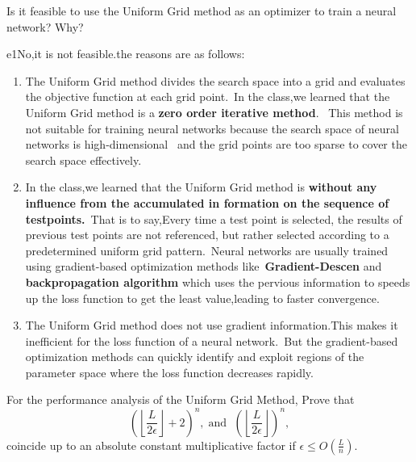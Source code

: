 \documentclass{article}
\begin{document}
\begin{excercise}\label{e1}
Is it feasible to use the Uniform Grid method as an optimizer to train a neural network?  Why?
\end{excercise}
\begin{SOLUTION}{e1}No,it is not feasible.the reasons are as follows:\\
\begin{enumerate}
	\item The Uniform Grid method divides the search space into a grid and evaluates the objective function at each grid point.\ 
	In the class,we learned that the Uniform Grid method is a \textbf{zero order iterative method}. \ 
	This method is not suitable for training neural networks because the search space of neural networks is high-dimensional \  
	and the grid points are too sparse to cover the search space effectively. 
	\item In the class,we learned that the Uniform Grid method is \textbf{without any influence from the accumulated in formation on the sequence of testpoints.}\
	That is to say,Every time a test point is selected, the results of previous test points are not referenced, but rather selected according to a predetermined uniform grid pattern.\
	Neural networks are usually trained using gradient-based optimization methods like\ 
	\textbf{Gradient-Descen} and \textbf{backpropagation algorithm} which uses the pervious information to speeds up the loss function to get the least value,leading to faster convergence.\ 
	\item The Uniform Grid method does not use gradient information.This makes it inefficient for the loss function of a neural network.\ 
	But the gradient-based optimization methods can quickly identify and exploit regions of the parameter space where the loss function decreases rapidly.
\end{enumerate}
\end{SOLUTION}

\begin{excercise}\label{e2}
	For the performance analysis of the Uniform Grid Method, Prove that
	\begin{equation}
		\left( \left \lfloor \frac{L}{2\epsilon} \right \rfloor + 2 \right)^n,\; \textrm{and } \; \left( \left \lfloor \frac{L}{2\epsilon} \right \rfloor \right)^n,\nonumber
	\end{equation}
	coincide up to an absolute constant multiplicative factor if $\epsilon \leq O(\frac{L}{n})$.
\end{excercise}
\end{document}
